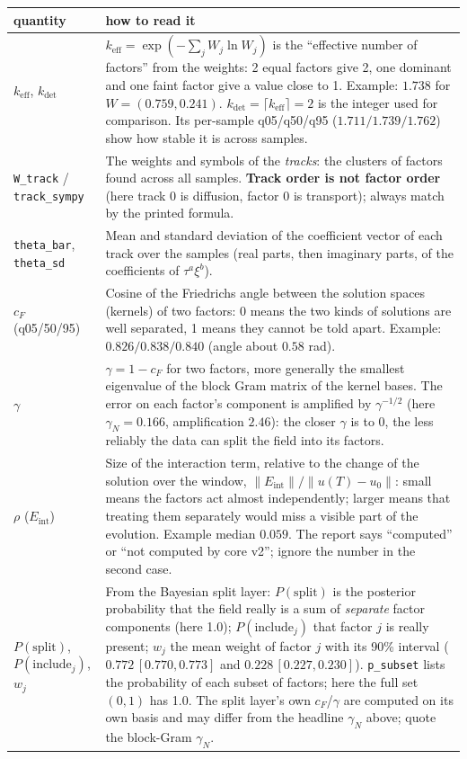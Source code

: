 \documentclass[11pt,a4paper]{article}
\newcommand{\code}[1]{\texttt{#1}}
\begin{document}
\begin{center}\small
\begin{tabular}{L{4.0cm}L{10.0cm}}\toprule
\textbf{quantity} & \textbf{how to read it}\\\midrule
$k_\mathrm{eff}$, $k_\mathrm{det}$ & $k_\mathrm{eff}=\exp(-\sum_jW_j\ln W_j)$ is the ``effective number of factors'' from the weights: 2 equal factors give 2, one dominant and one faint factor give a value close to 1. Example: $1.738$ for $W=(0.759,0.241)$. $k_\mathrm{det}=\lceil k_\mathrm{eff}\rceil=2$ is the integer used for comparison. Its per-sample q05/q50/q95 ($1.711/1.739/1.762$) show how stable it is across samples.\\
\code{W\_track} / \code{track\_sympy} & The weights and symbols of the \emph{tracks}: the clusters of factors found across all samples. \textbf{Track order is not factor order} (here track 0 is diffusion, factor 0 is transport); always match by the printed formula.\\
\code{theta\_bar}, \code{theta\_sd} & Mean and standard deviation of the coefficient vector of each track over the samples (real parts, then imaginary parts, of the coefficients of $\tau^a\xi^b$).\\
$c_F$ (q05/50/95) & Cosine of the Friedrichs angle between the solution spaces (kernels) of two factors: 0 means the two kinds of solutions are well separated, 1 means they cannot be told apart. Example: $0.826/0.838/0.840$ (angle about $0.58$ rad).\\
$\gamma$ & $\gamma=1-c_F$ for two factors, more generally the smallest eigenvalue of the block Gram matrix of the kernel bases. The error on each factor's component is amplified by $\gamma^{-1/2}$ (here $\gamma_N=0.166$, amplification $2.46$): the closer $\gamma$ is to 0, the less reliably the data can split the field into its factors.\\
$\rho$ ($E_\mathrm{int}$) & Size of the interaction term, relative to the change of the solution over the window, $\|E_\mathrm{int}\|/\|u(T)-u_0\|$: small means the factors act almost independently; larger means that treating them separately would miss a visible part of the evolution. Example median $0.059$. The report says ``computed'' or ``not computed by core v2''; ignore the number in the second case.\\
$P(\text{split})$, $P(\text{include}_j)$, $w_j$ & From the Bayesian split layer: $P(\text{split})$ is the posterior probability that the field really is a sum of \emph{separate} factor components (here 1.0); $P(\text{include}_j)$ that factor $j$ is really present; $w_j$ the mean weight of factor $j$ with its 90\% interval ($0.772\,[0.770,0.773]$ and $0.228\,[0.227,0.230]$). \code{p\_subset} lists the probability of each subset of factors; here the full set $(0,1)$ has 1.0. The split layer's own $c_F$/$\gamma$ are computed on its own basis and may differ from the headline $\gamma_N$ above; quote the block-Gram $\gamma_N$.\\\bottomrule
\end{tabular}
\end{center}
\end{document}
